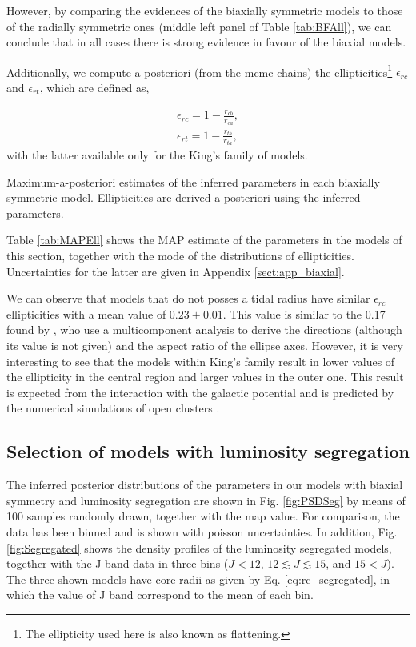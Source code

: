 However, by comparing the evidences of the biaxially symmetric models to those of the radially symmetric ones (middle left panel of  Table \ref{tab:BFAll}), 
we can conclude that in all cases there is strong evidence in favour of the biaxial models.


Additionally, we compute a posteriori (from the \gls{mcmc} chains) the ellipticities\footnote{The ellipticity used here is also known as flattening.}  $\epsilon_{rc}$ and $\epsilon_{rt}$, which are defined as,

\begin{align}
\epsilon_{rc} = 1- \frac{r_{cb}}{r_{ca}}, \nonumber \\
\epsilon_{rt} = 1- \frac{r_{tb}}{r_{ta}}, \nonumber
\end{align}
with the latter available only for the King's family of models. 

 \begin{table}[ht!]
  \centering
      \caption[]{Maximum-a-posteriori estimates of the inferred parameters in each biaxially symmetric model. Ellipticities are derived a posteriori using the inferred parameters.}
         \label{tab:MAPEll}
          \resizebox{\textwidth}{!}{
         
         }
   \end{table}
   
Table \ref{tab:MAPEll} shows the MAP estimate of the parameters in the models of this section, together with the mode of the distributions of ellipticities. Uncertainties for the latter are given in Appendix \ref{sect:app_biaxial}.

We can observe that models that do not posses a tidal radius have similar $\epsilon_{rc}$ ellipticities with a mean value of $0.23\pm0.01$. This value is similar to the 0.17  found by \citep{Raboud1998}, who use a multicomponent analysis to derive the directions (although its value is not given) and the aspect ratio of the ellipse axes. However, it is very interesting to see that the models within King's family result in lower values of the ellipticity in the central region and larger values in the outer one. This result is expected from the interaction with the galactic potential and is predicted by the numerical simulations of open clusters \cite[see for example][]{1987MNRAS.224..193T}.

\subsection{Selection of models with luminosity segregation}
\label{sect:luminosity_segregation}
The inferred posterior distributions of the parameters in our models with biaxial symmetry and luminosity segregation are shown in Fig. \ref{fig:PSDSeg} by means of 100 samples randomly drawn, together with the \gls{map} value. For comparison, the data has been binned and is shown with poisson uncertainties. In addition, Fig. \ref{fig:Segregated} shows the density profiles of the luminosity segregated models, together with the J band data in three bins ($J < 12$, $12 \lesssim J \lesssim 15$, and $15 < J$). The three shown models have core radii as given by Eq. \ref{eq:rc_segregated}, in which the value of J band correspond to the mean of each bin.

